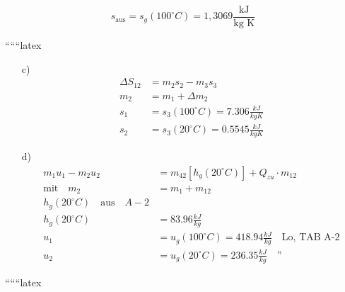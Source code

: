 \[
s_{\text{aus}} = s_g(100^\circ C) = 1,3069 \frac{\text{kJ}}{\text{kg K}}
\]

``````latex


\begin{itemize}
    \item[c)] 
    \begin{align*}
        \Delta S_{12} &= m_2 s_2 - m_3 s_3 \\
        m_2 &= m_1 + \Delta m_2 \\
        s_1 &= s_3 (100^\circ C) = 7.306 \frac{kJ}{kg K} \\
        s_2 &= s_3 (20^\circ C) = 0.5545 \frac{kJ}{kg K}
    \end{align*}
    
    \item[d)] 
    \begin{align*}
        m_1 u_1 - m_2 u_2 &= m_{42} \left[ h_{g} (20^\circ C) \right] + Q_{zu} \cdot m_{12} \\
        \text{mit} \quad m_2 &= m_1 + m_{12} \\
        h_{g} (20^\circ C) \quad \text{aus} \quad A-2 \\
        h_{g} (20^\circ C) &= 83.96 \frac{kJ}{kg} \\
        u_1 &= u_{g} (100^\circ C) = 418.94 \frac{kJ}{kg} \quad \text{Lo, TAB A-2} \\
        u_2 &= u_{g} (20^\circ C) = 236.35 \frac{kJ}{kg} \quad \text{''}
    \end{align*}
\end{itemize}

``````latex


